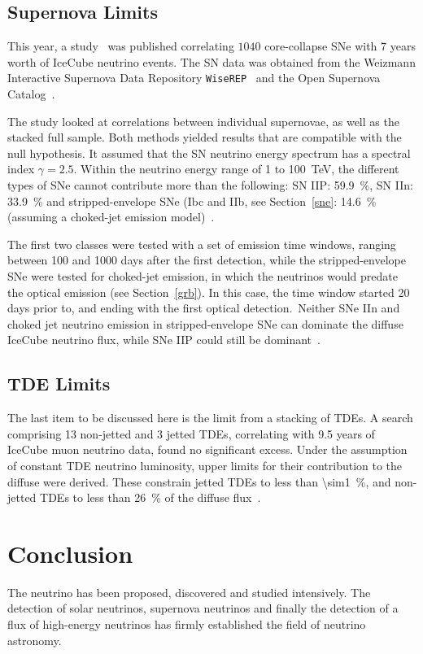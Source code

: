 \subsection{Supernova Limits}
This year, a study~ was published correlating $1040$ core-collapse SNe with 7 years worth of IceCube neutrino events. The SN data was obtained from the Weizmann Interactive Supernova Data Repository \texttt{WiseREP}~ and the Open Supernova Catalog~.

The study looked at correlations between individual supernovae, as well as the stacked full sample. Both methods yielded results that are compatible with the null hypothesis. It assumed that the SN neutrino energy spectrum has a spectral index $\gamma=2.5$. Within the neutrino energy range of 1 to \SI{100}{\tera\eV}, the different types of SNe cannot contribute more than the following: SN IIP: \SI{59.9}{\percent}, SN IIn: \SI{33.9}{\percent} and stripped-envelope SNe (Ibc and IIb, see Section~\ref{sne}: \SI{14.6}{\percent} (assuming a choked-jet emission model)~\cite{Necker2023}.

The first two classes were tested with a set of emission time windows, ranging between 100 and 1000 days after the first detection, while the stripped-envelope SNe were tested for choked-jet emission, in which the neutrinos would predate the optical emission (see Section~\ref{grb}). In this case, the time window started 20 days prior to, and ending with the first optical detection.\ Neither SNe IIn and choked jet neutrino emission in stripped-envelope SNe can dominate the diffuse IceCube neutrino flux, while SNe IIP could still be dominant~\cite{Necker2023}.

\subsection{TDE Limits}
The last item to be discussed here is the limit from a stacking of TDEs. A search comprising 13 non-jetted and 3 jetted TDEs, correlating with 9.5 years of IceCube muon neutrino data, found no significant excess. Under the assumption of constant TDE neutrino luminosity, upper limits for their contribution to the diffuse were derived. These constrain jetted TDEs to less than \SI{\sim1}{\percent}, and non-jetted TDEs to less than \SI{26}{\percent} of the diffuse flux~.

\section{Conclusion}
The neutrino has been proposed, discovered and studied intensively. The detection of solar neutrinos, supernova neutrinos and finally the detection of a flux of high-energy neutrinos has firmly established the field of neutrino astronomy.

